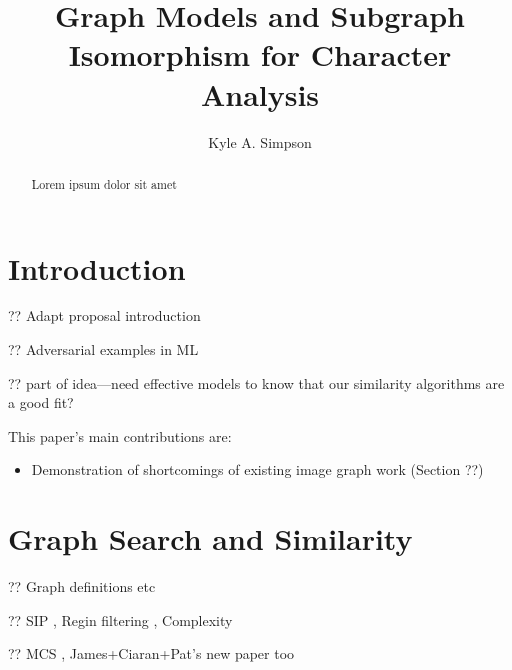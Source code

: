 \documentclass{mpaper}
\begin{document}
\title{Graph Models and Subgraph Isomorphism for Character Analysis}
\author{Kyle A. Simpson}

\maketitle
\begin{abstract}
Lorem ipsum dolor sit amet
\end{abstract}

\section{Introduction}
\label{sec:introduction}

?? Adapt proposal introduction

?? Adversarial examples in ML \cite{AdversarialML}

?? part of idea---need effective models to know that our similarity algorithms are a good fit?


This paper's main contributions are:
\begin{itemize}
\item Demonstration of shortcomings of existing image graph work (Section ??)
\end{itemize}

\section{Graph Search and Similarity}
\label{sec:graph-search}

?? Graph definitions etc

?? SIP \cite{SIP-VF2, SIP-LAD, SIP-SND, SIP-Glasgow}, Regin filtering \cite{AllDiff}, Complexity \cite{Cook-SAT-SIP-NP,Computers-and-Intractibility}

?? MCS \cite{Between-MCS-SIP}, James+Ciaran+Pat's new paper too \cite{MCS-McSplit}
\end{document}
